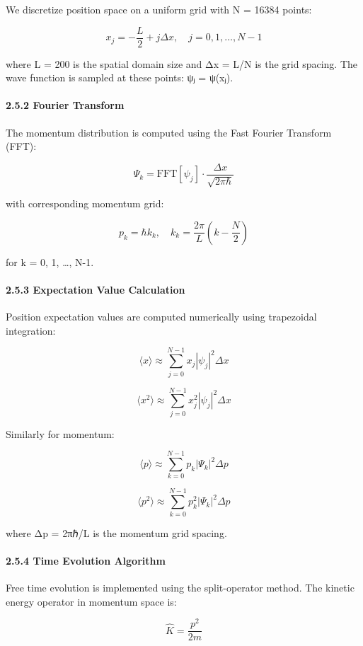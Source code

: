 \documentclass[
  11pt,
]{article}
\begin{document}
We discretize position space on a uniform grid with N = 16384 points:

\[x_j = -\frac{L}{2} + j\Delta x, \quad j = 0,1,\ldots,N-1\]

where L = 200 is the spatial domain size and Δx = L/N is the grid
spacing. The wave function is sampled at these points: ψⱼ = ψ(xⱼ).

\paragraph{2.5.2 Fourier Transform}\label{fourier-transform}

The momentum distribution is computed using the Fast Fourier Transform
(FFT):

\[\Psi_k = \text{FFT}[\psi_j] \cdot \frac{\Delta x}{\sqrt{2\pi\hbar}}\]

with corresponding momentum grid:

\[p_k = \hbar k_k, \quad k_k = \frac{2\pi}{L}\left(k - \frac{N}{2}\right)\]

for k = 0, 1, \ldots, N-1.

\paragraph{2.5.3 Expectation Value
Calculation}\label{expectation-value-calculation}

Position expectation values are computed numerically using trapezoidal
integration:

\[\langle x \rangle \approx \sum_{j=0}^{N-1} x_j |\psi_j|^2 \Delta x\]

\[\langle x^2 \rangle \approx \sum_{j=0}^{N-1} x_j^2 |\psi_j|^2 \Delta x\]

Similarly for momentum:

\[\langle p \rangle \approx \sum_{k=0}^{N-1} p_k |\Psi_k|^2 \Delta p\]

\[\langle p^2 \rangle \approx \sum_{k=0}^{N-1} p_k^2 |\Psi_k|^2 \Delta p\]

where Δp = 2πℏ/L is the momentum grid spacing.

\paragraph{2.5.4 Time Evolution
Algorithm}\label{time-evolution-algorithm}

Free time evolution is implemented using the split-operator method. The
kinetic energy operator in momentum space is:

\[\hat{K} = \frac{p^2}{2m}\]
\end{document}
